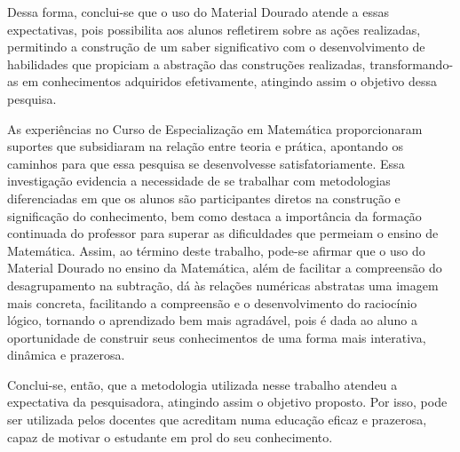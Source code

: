 \begin{refsection}
    Dessa forma, conclui-se que o uso do Material Dourado atende a essas expectativas, pois possibilita aos alunos refletirem sobre as ações realizadas, permitindo a construção de um saber significativo com o desenvolvimento de habilidades que propiciam a abstração das construções realizadas, transformando-as em conhecimentos adquiridos efetivamente, atingindo assim o objetivo dessa pesquisa.  

    As experiências no Curso de Especialização em Matemática proporcionaram suportes que subsidiaram na relação entre teoria e prática, apontando os caminhos para que essa pesquisa se desenvolvesse satisfatoriamente. Essa investigação evidencia a necessidade de se trabalhar com metodologias diferenciadas em que os alunos são participantes diretos na construção e significação do conhecimento, bem como destaca a importância da formação continuada do professor para superar as dificuldades que permeiam o ensino de Matemática. Assim, ao término deste trabalho, pode-se afirmar que o uso do Material Dourado no ensino da Matemática, além de facilitar a compreensão do desagrupamento na subtração, dá às relações numéricas abstratas uma imagem mais concreta, facilitando a compreensão e o desenvolvimento do raciocínio lógico, tornando o aprendizado bem mais agradável, pois é dada ao aluno a oportunidade de construir seus conhecimentos de uma forma mais interativa, dinâmica e prazerosa.   

    Conclui-se, então, que a metodologia utilizada nesse trabalho atendeu a expectativa da pesquisadora, atingindo assim o objetivo proposto. Por isso, pode ser utilizada pelos docentes que acreditam numa educação eficaz e prazerosa, capaz de motivar o estudante em prol do seu conhecimento. 

    \nocite{NETO2005Didática}
    \nocite{PANNIZA2006Ensinar}

    \printbibliography[heading=subbibliography,notcategory=fullcited]

    \label{chap:material-douradoend}

\end{refsection}
